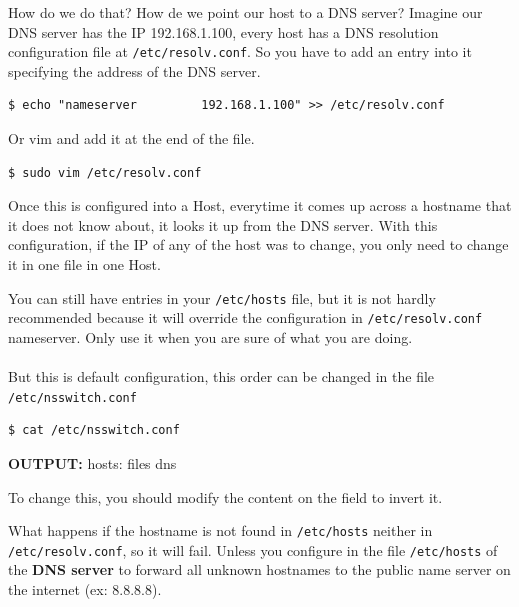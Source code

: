 \documentclass{article}
\newenvironment{blocktemplateIII}[1]{%
    \tcolorbox[beamer,%
    noparskip,breakable,
    ,colframe=Red,%
    colbacklower=LimeGreen!75!LightGreen,%
    title=#1]}%
    {\endtcolorbox}
\newenvironment{codetemplate}[1][]{%
  \mybasecolorbox[#1]
  \itshape
}{%
  \endmybasecolorbox
}
\begin{document}
How do we do that? How de we point our host to a DNS server? Imagine our DNS server has the IP 192.168.1.100, every host has a DNS resolution configuration file at \verb|/etc/resolv.conf|. So you have to add an entry into it specifying the address of the DNS server.

\begin{codetemplate}{}
\begin{verbatim}
$ echo "nameserver         192.168.1.100" >> /etc/resolv.conf
\end{verbatim}
\end{codetemplate}

Or vim and add it at the end of the file.
\begin{codetemplate}{}
\begin{verbatim}
$ sudo vim /etc/resolv.conf
\end{verbatim}
\end{codetemplate}

Once this is configured into a Host, everytime it comes up across a hostname that it does not know about, it looks it up from the DNS server. With this configuration, if the IP of any of the host was to change, you only need to change it in one file in one Host.

\begin{blocktemplateIII}{WARNING}
You can still have entries in your \verb|/etc/hosts| file, but it is not hardly recommended because it will override the configuration in \verb|/etc/resolv.conf| nameserver. Only use it when you are sure of what you are doing.
\\\\
But this is default configuration, this order can be changed in the file \verb|/etc/nsswitch.conf|
\begin{codetemplate}{}
\begin{verbatim}
$ cat /etc/nsswitch.conf
\end{verbatim}
\end{codetemplate}

\textbf{OUTPUT:} hosts:    files dns

To change this, you should modify the content on the field to invert it.
\end{blocktemplateIII}

What happens if the hostname is not found in \verb|/etc/hosts| neither in \verb|/etc/resolv.conf|, so it will fail. Unless you configure in the file \verb|/etc/hosts| of the \textbf{DNS server} to forward all unknown hostnames to the public name server on the internet (ex: 8.8.8.8).
\end{document}
